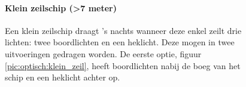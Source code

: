 \begin{figure}[H]
	\centering
	\begin{minipage}[t]{0.50\textwidth}
		\paragraph{Klein zeilschip (>7 meter)}
		Een klein zeilschip draagt 's nachts wanneer deze enkel zeilt drie lichten: twee boordlichten en een heklicht. Deze mogen in twee uitvoeringen gedragen worden. De eerste optie, figuur \ref{pic:optisch:klein_zeil}, heeft boordlichten nabij de boeg van het schip en een heklicht achter op.
	\end{minipage}
	\hfill
	\begin{minipage}[t]{0.22\textwidth}
		\RemoveLine
		\caption{}
		\label{pic:optisch:klein_zeil}
	\end{minipage}
	\hfill
	\begin{minipage}[t]{0.22\textwidth}
		\RemoveLine
		\caption{}
		\label{pic:optisch:klein_zeil2}
	\end{minipage}
\end{figure}%
